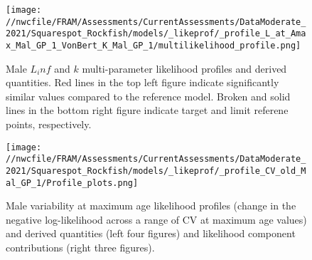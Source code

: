 \documentclass[11pt,
  english,
  a4paper,
]{article}
\begin{document}
\tagmcend\tagstructend


\begin{figure}
\centering
\texttt{[image: //nwcfile/FRAM/Assessments/CurrentAssessments/DataModerate\_2021/Squarespot\_Rockfish/models/\_likeprof/\_profile\_L\_at\_Amax\_Mal\_GP\_1\_VonBert\_K\_Mal\_GP\_1/multilikelihood\_profile.png]}
\caption{Male {\(L_inf\)\leavevmode\tagmcend\tagstructend} and {\(k\)\leavevmode\tagmcend\tagstructend} multi-parameter likelihood profiles and derived quantities. Red lines in the top left figure indicate significantly similar values compared to the reference model. Broken and solid lines in the bottom right figure indicate target and limit referene points, respectively.\label{fig:Linf_k_m-profile}}
\end{figure}

\tagmcend\tagstructend


\begin{figure}
\centering
\texttt{[image: //nwcfile/FRAM/Assessments/CurrentAssessments/DataModerate\_2021/Squarespot\_Rockfish/models/\_likeprof/\_profile\_CV\_old\_Mal\_GP\_1/Profile\_plots.png]}
\caption{Male variability at maximum age likelihood profiles (change in the negative log-likelihood across a range of CV at maximum age values) and derived quantities (left four figures) and likelihood component contributions (right three figures).\label{fig:CVold_m-profile-combo}}
\end{figure}

\tagmcend\tagstructend

\end{document}
